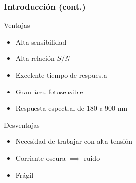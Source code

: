 \documentclass{beamer}
\begin{document}
\begin{frame}
\begin{columns}
\begin{column}{0.4\textwidth}
\end{column}
\end{columns}
\end{frame} 

\begin{frame}
\frametitle{Introducción (cont.)}
\begin{exampleblock}{Ventajas}
\begin{itemize}
\item Alta sensibilidad
\item Alta relación $S/N$
\item Excelente tiempo de respuesta
\item Gran área fotosensible
\item Respuesta espectral de 180 a 900 nm
\end{itemize}
\end{exampleblock}\pause
\begin{alertblock}{Desventajas}
\begin{itemize}
\item Necesidad de trabajar con alta tensión
\item Corriente oscura $\implies$ ruido
\item Frágil
\end{itemize}
\end{alertblock}
\end{frame} 
\end{document}
